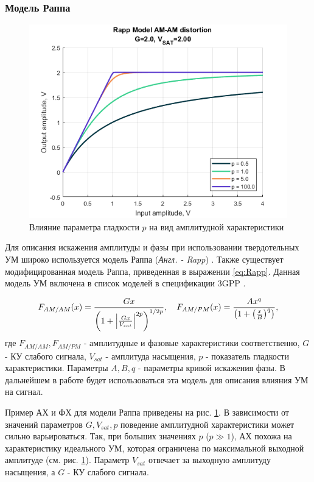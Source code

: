 \subsubsection{Модель Раппа}
\begin{figure}[h!]
    \centering
    \includegraphics[width=0.7\linewidth]{figs/rapp_p.png}
    \caption{Влияние параметра гладкости $p$ на вид амплитудной
    характеристики
    }
    \label{fig:rapp_p_parameters}
\end{figure}
Для описания искажения амплитуды и фазы при использовании твердотельных УМ
широко используется модель Раппа (\textit{Англ. - Rapp}) \cite{Rapp1991} \cite{Maltsev2010}.
Также существует модифицированная модель Раппа, приведенная в выражении
\ref{eq:Rapp}. Данная модель УМ включена в список моделей в спецификации
3GPP \cite{3gpp.38.803}.

\begin{equation}
    F_{AM/AM}(x) = \frac{G x}{\left( 1 + \abs{\frac{Gx}{V_{sat}}}^{2p}\right)^{1/2p}},
    \quad 
    F_{AM/PM}(x) = \frac{Ax^q}{\left(1+\left(\frac{x}{B}\right)^q\right)},
    \label{eq:Rapp}
\end{equation}
где $F_{AM/AM}, F_{AM/PM}$ - амплитудные и фазовые характеристики
соответственно, $G$ - КУ слабого сигнала, $V_{sat}$ - амплитуда насыщения,
$p$ - показатель гладкости характеристики. Параметры $A,B,q$ - параметры
кривой искажения фазы. В дальнейшем в работе будет использоваться эта
модель для описания влияния УМ на сигнал.

Пример АХ и ФХ для модели Раппа приведены на  рис. \ref{fig:rapp_p_parameters}.
В зависимости от значений параметров $G, V_{sat}, p$ поведение амплитудной
характеристики может сильно варьироваться. Так, при больших значениях $p$
($p\gg 1$), АХ похожа на характеристику идеального УМ, которая ограничена
по максимальной выходной амплитуде (см. рис. \ref{fig:rapp_p_parameters}).
Параметр $V_{sat}$ отвечает за выходную амплитуду насыщения, а $G$ - КУ
слабого сигнала.


